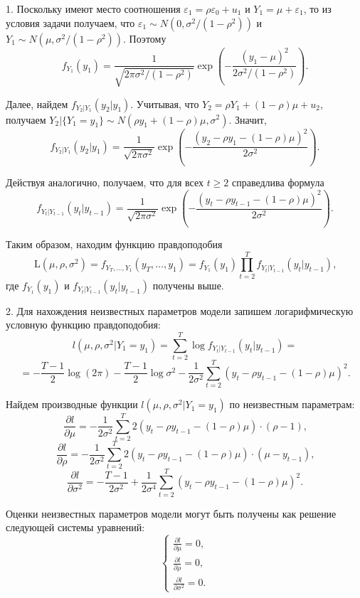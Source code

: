\begin{solution}
1. Поскольку имеют место соотношения $\varepsilon_1 = \rho \varepsilon_0 + u_1$ и $Y_1 =\mu + \varepsilon_1$, то из условия задачи получаем, что $\varepsilon_1 \sim N(0,\sigma^2 / (1 - \rho^2))$
и $Y_1 \sim N(\mu,\sigma^2 / (1 - \rho^2))$. Поэтому
\[
f_{Y_1}(y_1) = \frac{1}{\sqrt{2\pi\sigma^2/(1-\rho^2)}}\exp{\left(-\frac{(y_1 - \mu)^2}{2\sigma^2/(1 - \rho^2)}\right)}.
\]

Далее, найдем $f_{Y_2|Y_1}(y_2|y_1)$. Учитывая, что $Y_2 = \rho Y_1 + (1- \rho) \mu + u_2$, получаем $Y_2|\{Y_1 = y_1\} \sim N(\rho y_1 + (1- \rho) \mu, \sigma^2)$. Значит,
\[
f_{Y_2|Y_1}(y_2|y_1) = \frac{1}{\sqrt{2\pi\sigma^2}}\exp{\left(-\frac{(y_2 - \rho y_1 - (1- \rho) \mu)^2}{2\sigma^2}\right)}.
\]

Действуя аналогично, получаем, что для всех $t \geq 2$ справедлива формула
\[
f_{Y_{t}|Y_{t-1}}(y_{t}|y_{t-1}) = \frac{1}{\sqrt{2\pi\sigma^2}}\exp{\left(-\frac{(y_{t} - \rho y_{t-1} - (1- \rho) \mu)^2}{2\sigma^2}\right)}.
\]

Таким образом, находим функцию правдоподобия
\[
\mathrm{L}(\mu, \rho, \sigma^2) = f_{Y_T,\ldots,Y_1}(y_T,\dots,y_1) = f_{Y_1}(y_1)\prod_{t=2}^{T}f_{Y_t|Y_{t-1}}(y_t|y_{t-1}) \text{,}
\]
где $f_{Y_1}(y_1)$ и $f_{Y_t|Y_{t-1}}(y_t|y_{t-1})$ получены выше.

2. Для нахождения неизвестных параметров модели запишем логарифмическую условную функцию правдоподобия:
\[
l(\mu, \rho, \sigma^2|Y_1 = y_1) = \sum_{t=2}^{T}\log{f_{Y_t|Y_{t-1}}(y_t|y_{t-1})} = 
\]
\[
=-\frac{T-1}{2} \log(2 \pi) - \frac{T-1}{2} \log{\sigma^2} - \frac{1}{2\sigma^2} \sum_{t=2}^{T}(y_t - \rho y_{t-1} - (1 - \rho) \mu)^2 \text{.} 
\]

Найдем производные функции $l(\mu, \rho, \sigma^2|Y_1 = y_1)$ по неизвестным параметрам:
\[
\frac{\partial l}{\partial \mu} = -\frac{1}{2\sigma^2} \sum_{t=2}^{T} 2(y_t - \rho y_{t-1} - (1 - \rho) \mu) \cdot (\rho - 1) \text{,}
\]
\[
\frac{\partial l}{\partial \rho} = -\frac{1}{2\sigma^2} \sum_{t=2}^{T} 2(y_t - \rho y_{t-1} - (1 - \rho) \mu) \cdot (\mu - y_{t-1}) \text{,}
\]
\[
\frac{\partial l}{\partial {\sigma^2}} =  - \frac{T-1}{2\sigma^2} + \frac{1}{2\sigma^4} \sum_{t=2}^{T}(y_t - \rho y_{t-1} - (1 - \rho) \mu)^2 \text{.}
\]

Оценки неизвестных параметров модели могут быть получены как решение следующей системы уравнений:
\[
\left\{
  \begin{aligned}
    \frac{\partial l}{\partial \mu} = 0 \text{,} \\
    \frac{\partial l}{\partial \rho} = 0 \text{,} \\
    \frac{\partial l}{\partial {\sigma^2}} = 0 \text{.}
  \end{aligned}
\right.
\]


\end{solution}
